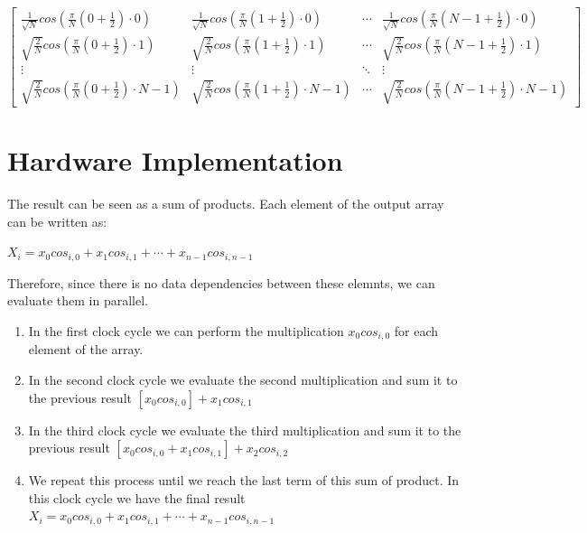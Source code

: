 \begin{center}	
$ \begin{bmatrix} \frac{1}{\sqrt{N}}cos(\frac{\pi}{N}(0+\frac{1}{2})\cdotp 0) & \frac{1}{\sqrt{N}}cos(\frac{\pi}{N}(1+\frac{1}{2})\cdotp 0) & \cdots & \frac{1}{\sqrt{N}}cos(\frac{\pi}{N}(N-1+\frac{1}{2})\cdotp 0) \\
\sqrt{\frac{2}{N}}cos(\frac{\pi}{N}(0+\frac{1}{2})\cdotp 1) & \sqrt{\frac{2}{N}}cos(\frac{\pi}{N}(1+\frac{1}{2})\cdotp 1) & \cdots & \sqrt{\frac{2}{N}}cos(\frac{\pi}{N}(N-1+\frac{1}{2})\cdotp 1) \\
\vdots  & \vdots  & \ddots & \vdots  \\
\sqrt{\frac{2}{N}}cos(\frac{\pi}{N}(0+\frac{1}{2})\cdotp N-1) & \sqrt{\frac{2}{N}}cos(\frac{\pi}{N}(1+\frac{1}{2})\cdotp N-1) & \cdots & \sqrt{\frac{2}{N}}cos(\frac{\pi}{N}(N-1+\frac{1}{2})\cdotp N-1) \end{bmatrix} $
\bigskip
\end{center}

  \section{Hardware Implementation} \label{DCTH}
The result can be seen as a sum of products.
Each element of the output array can be written as:
\begin{center}
	$ X_{i} =  x_{0}cos_{i,0}+x_{1}cos_{i,1}+ \cdots +x_{n-1}cos_{i,n-1}$
\end{center}

Therefore, since there is no data dependencies between these elemnts, we can evaluate them in parallel.
\begin{enumerate}
\item In the first clock cycle we can perform the multiplication $ x_{0}cos_{i,0} $ for each element of the array.
\item In the second clock cycle we evaluate the second multiplication and sum it to the previous result $  [x_{0}cos_{i,0}] + x_{1}cos_{i,1} $
\item In the third clock cycle we evaluate the third multiplication and sum it to the previous result $  [x_{0}cos_{i,0} + x_{1}cos_{i,1}] + x_{2}cos_{i,2}$
\item We repeat this process until we reach the last term of this sum of product. In this clock cycle we have the final result $ X_{i} =  x_{0}cos_{i,0}+x_{1}cos_{i,1}+ \cdots +x_{n-1}cos_{i,n-1}  $

\end{enumerate}

